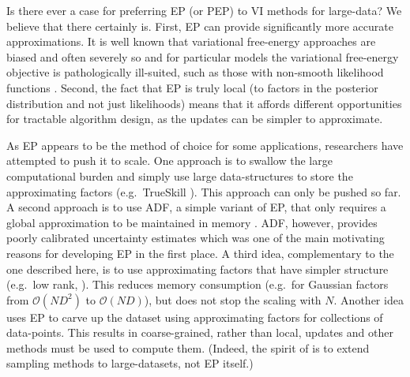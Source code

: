 Is there ever a case for preferring EP (or PEP) to VI methods for large-data?  We believe that there certainly is. First, EP can provide significantly more accurate approximations. It is well known that variational free-energy approaches are biased and often severely so \cite{turner+sahani:2011a} and for particular models the variational free-energy objective is pathologically ill-suited, such as those with non-smooth likelihood functions \cite{cunningham:gaussianEP,turner+sahani:2011c}. Second, the fact that EP is truly local (to factors in the posterior distribution and not just likelihoods) means that it affords different opportunities for tractable algorithm design, as the updates can be simpler to approximate.

As EP appears to be the method of choice for some applications, researchers have attempted to push it to scale. One approach is to swallow the large computational burden and simply use large data-structures to store the approximating factors (e.g.~TrueSkill \cite{herbrich:trueskill}). This approach can only be pushed so far. A second approach is to use ADF, a simple variant of EP, that only requires a global approximation to be maintained in memory \cite{maybeck:adf}. ADF, however, provides poorly calibrated uncertainty estimates \cite{minka:ep} which was one of the main motivating reasons for developing EP in the first place. 
A third idea, complementary to the one described here, is to use approximating factors that have simpler structure (e.g.~low rank, \cite{qi+minka:sparseGP}). This reduces memory consumption (e.g.~for Gaussian factors from $\mathcal{O}(ND^2)$ to $\mathcal{O}(ND)$), but does not stop the scaling with $N$. Another idea uses EP to carve up the dataset \cite{gelman:dep,xu:sms} using approximating factors for collections of data-points. This results in coarse-grained, rather than local, updates and other methods must be used to compute them. (Indeed, the spirit of \cite{gelman:dep,xu:sms} is to extend sampling methods to large-datasets, not EP itself.) 

